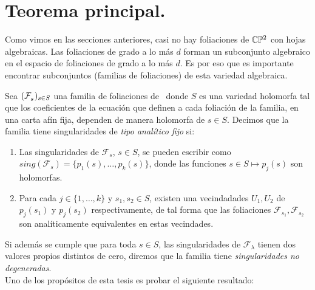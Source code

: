 \section{Teorema principal.}

Como vimos en las secciones anteriores, casi no hay foliaciones de $\mathbb{C}\mathbb{P}^2$ con hojas algebraicas. Las foliaciones de grado a lo más $d$ forman un subconjunto algebraico en el espacio de foliaciones de grado a lo más $d$. Es por eso que es importante encontrar subconjuntos (familias de foliaciones) de esta variedad algebraica.
\begin{defn}
\label{Def:TipoAnFijo}
Sea $(\mathcal{F}^{\ }_{s})_{s\in S}$ una familia de foliaciones de \CP\, donde $S$ es una variedad holomorfa tal que los coeficientes de la ecuación que definen a cada foliación de la familia, en una carta afín fija, dependen de manera holomorfa de $s\in S$. Decimos que la familia tiene singularidades de \emph{tipo analítico fijo} si:

\begin{enumerate}

\item Las singularidades de $\mathcal{F}_s$, $s\in S$, se pueden escribir como $\mathit{sing}(\mathcal{F}_s) = \{p_1(s),\ldots,p_k(s) \}$, donde las funciones $s\in S\mapsto p_j(s)$ son holomorfas.

\item Para cada $j\in\{1,\ldots,k\}$ y $s_1,s_2\in S$, existen una vecindadades $U_1,U_2$ de $p_j(s_1)$ y $p_j(s_2)$ respectivamente, de tal forma que las foliaciones $\mathcal{F}_{s_1},\mathcal{F}_{s_2}$  son analíticamente equivalentes en estas vecindades.
\end{enumerate}
\end{defn}

Si además se cumple que para toda $s\in S$, las singularidades de $\mathcal{F}_\lambda$ tienen dos valores propios distintos de cero, diremos que la familia tiene \emph{singularidades no degeneradas}.
\\

Uno de los propósitos de esta tesis es probar el siguiente resultado:

